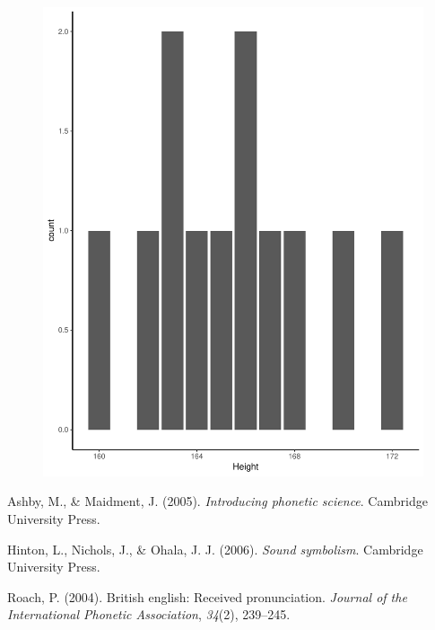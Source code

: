 \documentclass[man, fleqn, noextraspace]{apa6}
\begin{document}
\begin{figure}
\centering
\includegraphics{Vowel_v2_files/figure-latex/figure6-1.pdf}
\caption{}
\end{figure}

\begingroup
\setlength{\parindent}{-0.5in} \setlength{\leftskip}{0.5in}

\hypertarget{refs}{}
\hypertarget{ref-ashby2005}{}
Ashby, M., \& Maidment, J. (2005). \emph{Introducing phonetic science}.
Cambridge University Press.

\hypertarget{ref-hinton2006}{}
Hinton, L., Nichols, J., \& Ohala, J. J. (2006). \emph{Sound symbolism}.
Cambridge University Press.

\hypertarget{ref-roach2004}{}
Roach, P. (2004). British english: Received pronunciation. \emph{Journal
of the International Phonetic Association}, \emph{34}(2), 239--245.

\endgroup
\end{document}
